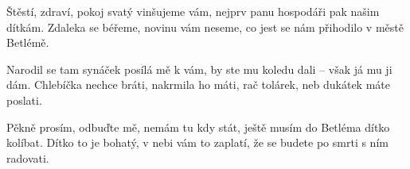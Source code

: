 \vskip-5mm
\IncludeLilypond

Štěstí, zdraví, pokoj svatý vinšujeme vám,
nejprv panu hospodáři pak našim dítkám.
Zdaleka se béřeme, novinu vám neseme,
co jest se nám přihodilo v městě Betlémě.

Narodil se tam synáček posílá mě k vám,
by ste mu koledu dali -- však já mu ji dám.
Chlebíčka nechce bráti, nakrmila ho máti,
rač tolárek, neb dukátek máte poslati.

Pěkně prosím, odbuďte mě, nemám tu kdy stát,
ještě musím do Betléma dítko kolíbat.
Dítko to je bohatý, v nebi vám to zaplatí,
že se budete po smrti s ním radovati.
